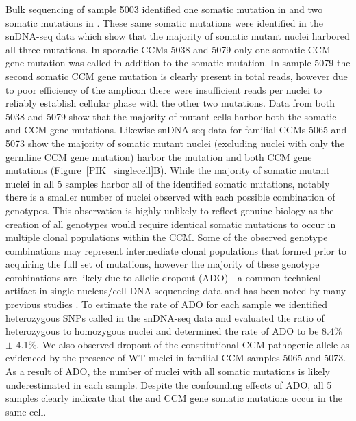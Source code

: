 Bulk sequencing of sample 5003 identified one somatic mutation in  and two somatic mutations in . These same somatic mutations were identified in the snDNA-seq data which show that the majority of somatic mutant nuclei harbored all three mutations. In sporadic CCMs 5038 and 5079 only one somatic CCM gene mutation was called in addition to the  somatic mutation. In sample 5079 the second somatic CCM gene mutation is clearly present in total reads, however due to poor efficiency of the amplicon there were insufficient reads per nuclei to reliably establish cellular phase with the other two mutations. Data from both 5038 and 5079 show that the majority of mutant cells harbor both the somatic  and CCM gene mutations. Likewise snDNA-seq data for familial CCMs 5065 and 5073 show the majority of somatic mutant nuclei (excluding nuclei with only the germline CCM gene mutation) harbor the  mutation and both CCM gene mutations (Figure~\ref{PIK_singlecell}B). While the majority of somatic mutant nuclei in all 5 samples harbor all of the identified somatic mutations, notably there is a smaller number of nuclei observed with each possible combination of genotypes. This observation is highly unlikely to reflect genuine biology as the creation of all genotypes would require identical somatic mutations to occur in multiple clonal populations within the CCM. Some of the observed genotype combinations may represent intermediate clonal populations that formed prior to acquiring the full set of mutations, however the majority of these genotype combinations are likely due to allelic dropout (ADO)---a common technical artifact in single-nucleus/cell DNA sequencing data and has been noted by many previous studies \citep{xu2019, szulwach2015, satas2018}. To estimate the rate of ADO for each sample we identified heterozygous SNPs called in the snDNA-seq data and evaluated the ratio of heterozygous to homozygous nuclei and determined the rate of ADO to be 8.4\% $\pm$ 4.1\%. We also observed dropout of the constitutional CCM pathogenic allele as evidenced by the presence of WT nuclei in familial CCM samples 5065 and 5073. As a result of ADO, the number of nuclei with all somatic mutations is likely underestimated in each sample. Despite the confounding effects of ADO, all 5 samples clearly indicate that the  and CCM gene somatic mutations occur in the same cell.

